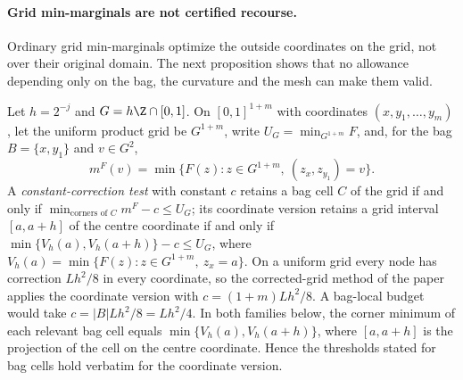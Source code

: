 \paragraph{Grid min-marginals are not certified recourse.}
Ordinary grid min-marginals optimize the outside coordinates on the grid,
not over their original domain. The next proposition shows that no
allowance depending only on the bag, the curvature and the mesh can make
them valid.

Let $h=2^{-j}$ and $G=h\Z\cap[0,1]$. On $[0,1]^{1+m}$ with coordinates
$(x,y_1,\ldots,y_m)$, let the uniform product grid be $G^{1+m}$, write
$U_G=\min_{G^{1+m}}F$, and, for the bag $B=\{x,y_1\}$ and $v\in G^2$,
\[
m^F(v)=\min\{F(z):z\in G^{1+m},\ (z_x,z_{y_1})=v\}.
\]
A \emph{constant-correction test} with constant $c$ retains a bag cell
$C$ of the grid if and only if $\min_{\text{corners of }C}m^F-c\le U_G$;
its coordinate version retains a grid interval $[a,a+h]$ of the centre
coordinate if and only if $\min\{V_h(a),V_h(a+h)\}-c\le U_G$, where
$V_h(a)=\min\{F(z):z\in G^{1+m},\ z_x=a\}$. On a uniform grid every node has
correction $Lh^2/8$ in every coordinate, so the corrected-grid method of
the paper applies the coordinate version with $c=(1+m)Lh^2/8$. A bag-local
budget would take $c=|B|Lh^2/8=Lh^2/4$. In both families below, the
corner minimum of each relevant bag cell equals
$\min\{V_h(a),V_h(a+h)\}$, where $[a,a+h]$ is the projection of the cell
on the centre coordinate. Hence the thresholds stated for bag cells hold
verbatim for the coordinate version.

